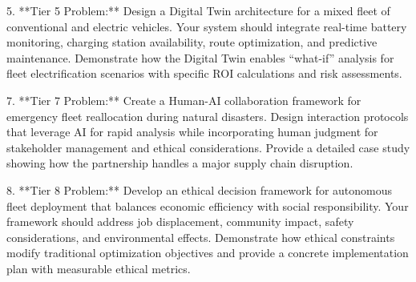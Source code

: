 \documentclass{article}
\begin{document}
5. **Tier 5 Problem:** Design a Digital Twin architecture for a mixed fleet of conventional and electric vehicles. Your system should integrate real-time battery monitoring, charging station availability, route optimization, and predictive maintenance. Demonstrate how the Digital Twin enables ``what-if'' analysis for fleet electrification scenarios with specific ROI calculations and risk assessments.

7. **Tier 7 Problem:** Create a Human-AI collaboration framework for emergency fleet reallocation during natural disasters. Design interaction protocols that leverage AI for rapid analysis while incorporating human judgment for stakeholder management and ethical considerations. Provide a detailed case study showing how the partnership handles a major supply chain disruption.

8. **Tier 8 Problem:** Develop an ethical decision framework for autonomous fleet deployment that balances economic efficiency with social responsibility. Your framework should address job displacement, community impact, safety considerations, and environmental effects. Demonstrate how ethical constraints modify traditional optimization objectives and provide a concrete implementation plan with measurable ethical metrics.
\end{document}
